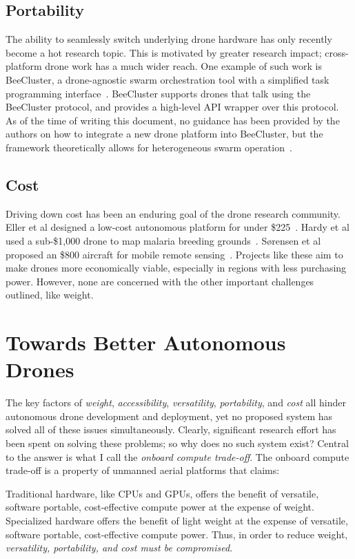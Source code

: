 \subsection{Portability}
The ability to seamlessly switch underlying drone hardware has only recently become a hot research topic. This is motivated by greater research impact; cross-platform drone work has a much wider reach. One example of such work is BeeCluster, a drone-agnostic swarm orchestration tool with a simplified task programming interface~\cite{He2020}. BeeCluster supports drones that talk using the BeeCluster protocol, and provides a high-level API wrapper over this protocol. As of the time of writing this document, no guidance has been provided by the authors on how to integrate a new drone platform into BeeCluster, but the framework theoretically allows for heterogeneous swarm operation~\cite{BeeCluster}.

\subsection{Cost}
Driving down cost has been an enduring goal of the drone research community. Eller et al designed a low-cost autonomous platform for under \$225~\cite{Eller2019}. Hardy et al used a sub-\$1,000 drone to map malaria breeding grounds~\cite{Hardy2017}. S{\o}rensen et al proposed an \$800 aircraft for mobile remote sensing~\cite{Sorensen2017}. Projects like these aim to make drones more economically viable, especially in regions with less purchasing power. However, none are concerned with the other important challenges outlined, like weight.  

\section{Towards Better Autonomous Drones}
\label{sec:better-autonomous-drones}
The key factors of \textit{weight}, \textit{accessibility}, \textit{versatility}, \textit{portability}, and \textit{cost} all hinder autonomous drone development and deployment, yet no proposed system has solved all of these issues simultaneously. Clearly, significant research effort has been spent on solving these problems; so why does no such system exist? Central to the answer is what I call the \textit{onboard compute trade-off}. The onboard compute trade-off is a property of unmanned aerial platforms that claims:

\begin{displayquote}
Traditional hardware, like CPUs and GPUs, offers the benefit of versatile, software portable, cost-effective compute power at the expense of weight. Specialized hardware offers the benefit of light weight at the expense of versatile, software portable, cost-effective compute power. Thus, in order to reduce weight, \textit{versatility, portability, and cost must be compromised}.
\end{displayquote}

